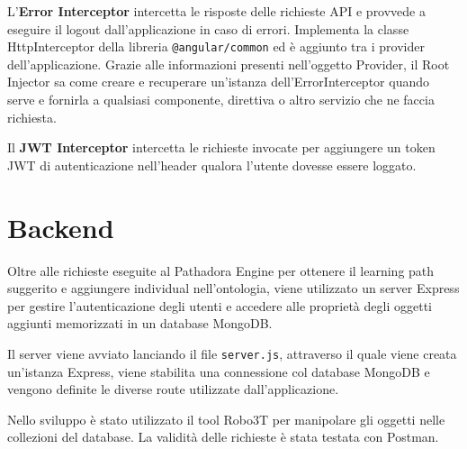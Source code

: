 \vspace{5mm}

L'\textbf{Error Interceptor} intercetta le risposte delle richieste API e provvede a eseguire il logout dall'applicazione in caso di errori. Implementa la classe HttpInterceptor della libreria \texttt{@angular/common} ed è aggiunto tra i provider dell'applicazione. Grazie alle informazioni presenti nell'oggetto Provider, il Root Injector sa come creare e recuperare un'istanza dell'ErrorInterceptor quando serve e fornirla a qualsiasi componente, direttiva o altro servizio che ne faccia richiesta.

\vspace{5mm}

Il \textbf{JWT Interceptor} intercetta le richieste invocate per aggiungere un token JWT di autenticazione nell'header qualora l'utente dovesse essere loggato.

\section{Backend}
Oltre alle richieste eseguite al Pathadora Engine per ottenere il learning path suggerito e aggiungere individual nell'ontologia, viene utilizzato un server Express per gestire l'autenticazione degli utenti e accedere alle proprietà degli oggetti aggiunti memorizzati in un database MongoDB.

Il server viene avviato lanciando il file \texttt{server.js}, attraverso il quale viene creata un'istanza Express, viene stabilita una connessione col database MongoDB e vengono definite le diverse route utilizzate dall'applicazione.

Nello sviluppo è stato utilizzato il tool Robo3T per manipolare gli oggetti nelle collezioni del database. La validità delle richieste è stata testata con Postman.

